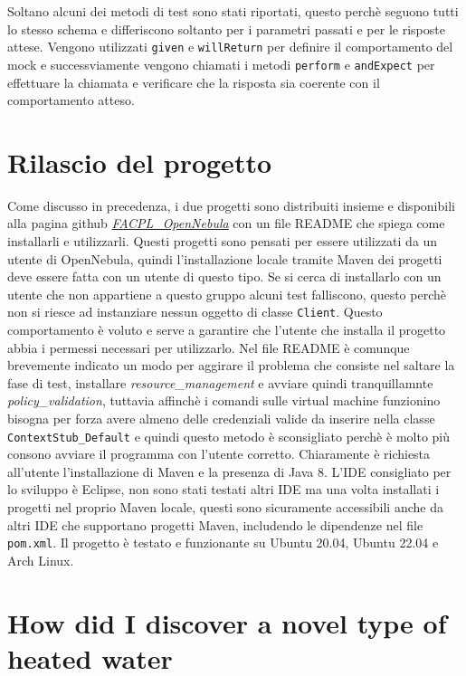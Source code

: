 Soltano alcuni dei metodi di test sono stati riportati, questo perchè seguono tutti lo stesso schema e differiscono soltanto per i parametri passati e per le risposte attese. Vengono utilizzati \texttt{given} e \texttt{willReturn} per definire il comportamento del mock e successviamente vengono chiamati i metodi \texttt{perform} e \texttt{andExpect} per effettuare la chiamata e verificare che la risposta sia coerente con il comportamento atteso.

\section{Rilascio del progetto}
Come discusso in precedenza, i due progetti sono distribuiti insieme e disponibili alla pagina github \href{https://github.com/alienix2/FACPL_Opennebula_thesis}{\emph{FACPL\_OpenNebula}} con un file README che spiega come installarli e utilizzarli. Questi progetti sono pensati per essere utilizzati da un utente di OpenNebula, quindi l'installazione locale tramite Maven dei progetti deve essere fatta con un utente di questo tipo. Se si cerca di installarlo con un utente che non appartiene a questo gruppo alcuni test falliscono, questo perchè non si riesce ad instanziare nessun oggetto di classe \texttt{Client}. Questo comportamento è voluto e serve a garantire che l'utente che installa il progetto abbia i permessi necessari per utilizzarlo. Nel file README è comunque brevemente indicato un modo per aggirare il problema che consiste nel saltare la fase di test, installare \emph{resource\_management} e avviare quindi tranquillamnte \emph{policy\_validation}, tuttavia affinchè i comandi sulle virtual machine funzionino bisogna per forza avere almeno delle credenziali valide da inserire nella classe \texttt{ContextStub\_Default} e quindi questo metodo è sconsigliato perchè è molto più consono avviare il programma con l'utente corretto.\medbreak
Chiaramente è richiesta all'utente l'installazione di Maven e la presenza di Java 8. L'IDE consigliato per lo sviluppo è Eclipse, non sono stati testati altri IDE ma una volta installati i progetti nel proprio Maven locale, questi sono sicuramente accessibili anche da altri IDE che supportano progetti Maven, includendo le dipendenze nel file \texttt{pom.xml}. Il progetto è testato e funzionante su Ubuntu 20.04, Ubuntu 22.04 e Arch Linux.


\newpage
\section{How did I discover a novel type of heated water}

